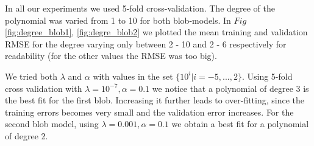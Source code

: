 In all our experiments we used 5-fold cross-validation. The degree of the polynomial was varied from 1 to 10 for both blob-models. In $Fig$ \ref{fig:degree_blob1}, \ref{fig:degre_blob2} we plotted the mean training and validation RMSE for the degree varying only between 2 - 10 and 2 - 6 respectively for readability (for the other values the RMSE was too big). 

We tried both $\lambda$ and $\alpha$ with values in the set $\{10^i | i =-5,...,2\}$.
Using 5-fold cross validation with $\lambda = 10^{-7}, \alpha = 0.1$ we
notice that a polynomial of degree 3 is the best fit for the first blob. Increasing it further leads to over-fitting, since the training errors becomes very small and the validation error increases. For the second blob model, using  $\lambda = 0.001, \alpha = 0.1$ we obtain a best fit for a polynomial of degree 2.

